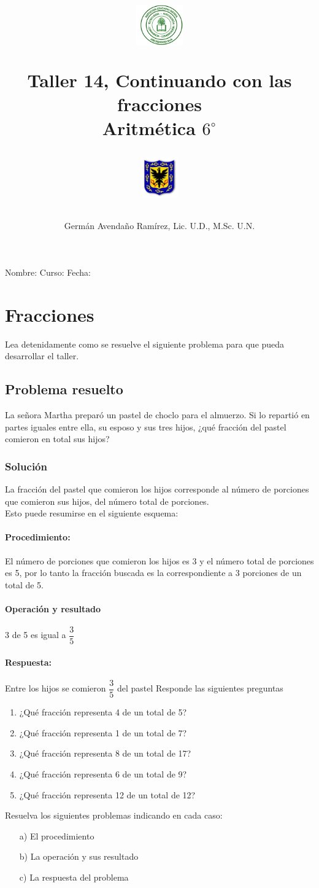 \documentclass[10pt,twoside]{article}
\author{Germ\'an Avenda\~no Ram\'irez, Lic. U.D., M.Sc. U.N.}
\title{\begin{minipage}{.2\textwidth}
\includegraphics[height=1.75cm]{Images/logo-colegio.png}\end{minipage}
\begin{minipage}{.55\textwidth}
\begin{center}
Taller 14, Continuando con las fracciones \\
Aritmética $6^{\circ}$
\end{center}
\end{minipage}\hfill
\begin{minipage}{.2\textwidth}
\includegraphics[height=1.75cm]{Images/logo-sed.png} 
\end{minipage}}
\date{}
\begin{document}
\maketitle
Nombre: \hrulefill Curso: \underline{\hspace*{44pt}} Fecha: \underline{\hspace*{2.5cm}}
\section*{Fracciones}
Lea detenidamente como se resuelve el siguiente problema para que pueda desarrollar el taller.
\subsection*{Problema resuelto}
La señora Martha prepar\'{o} un pastel de choclo para el almuerzo. Si lo reparti\'{o} en partes iguales entre ella, su esposo y sus tres hijos, ¿qu\'{e} fracci\'{o}n del pastel comieron en total sus hijos?
\subsubsection*{Soluci\'{o}n}
La fracci\'{o}n del pastel que comieron los hijos corresponde al n\'{u}mero de porciones que comieron sus hijos, del n\'{u}mero total de porciones.\\
Esto puede resumirse en el siguiente esquema:
\paragraph*{Procedimiento:}
El n\'{u}mero de porciones que comieron los hijos es 3 y el n\'{u}mero total de porciones es 5, por lo tanto la fracci\'{o}n buscada es la correspondiente a 3 porciones de un total de 5.
\paragraph*{Operaci\'{o}n y resultado}
3 de 5 es igual a \hspace*{.5cm} $\dfrac{3}{5}$
\paragraph*{Respuesta:}
Entre los hijos se comieron $\dfrac{3}{5}$ del pastel
Responde las siguientes preguntas
\begin{enumerate}
\item ¿Qu\'{e} fracci\'{o}n representa 4 de un total de 5?
\item ¿Qu\'{e} fracci\'{o}n representa 1 de un total de 7?
\item ¿Qu\'{e} fracci\'{o}n representa 8 de un total de 17?
\item ¿Qu\'{e} fracci\'{o}n representa 6 de un total de 9?
\item ¿Qu\'{e} fracci\'{o}n representa 12 de un total de 12?
\end{enumerate}
Resuelva los siguientes problemas indicando en cada caso:
\begin{enumerate}
\item[a)] El procedimiento
\item[b)] La operación y sus resultado
\item[c)] La respuesta del problema
\end{enumerate}
\end{document}
